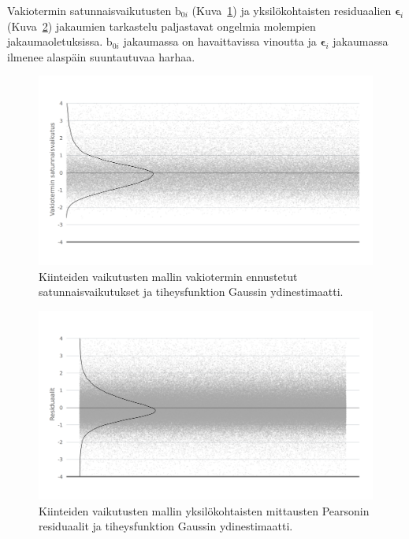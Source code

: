\documentclass[finnish]{docopts}
\begin{document}
Vakiotermin satunnaisvaikutusten $\text{b}_{0i}$ (Kuva~\ref{fig:lme1_ranef}) ja yksilökohtaisten residuaalien $\bm{\epsilon}_i$ (Kuva~\ref{fig:lme1_resid}) jakaumien tarkastelu paljastavat ongelmia molempien jakaumaoletuksissa. $\text{b}_{0i}$ jakaumassa on havaittavissa vinoutta ja $\bm{\epsilon}_i$ jakaumassa ilmenee alaspäin suuntautuvaa harhaa.\\

\begin{figure}[H]
\centering
  \includegraphics[scale=0.8]{kuvaajat/lme_satunnaisvaikutukset.png}
  \caption{Kiinteiden vaikutusten mallin vakiotermin ennustetut satunnaisvaikutukset ja tiheysfunktion Gaussin ydinestimaatti.}
  \label{fig:lme1_ranef}
\end{figure}

\begin{figure}[H]
\centering
  \includegraphics[scale=0.8]{kuvaajat/lme_residuaalit.png}
  \caption{Kiinteiden vaikutusten mallin yksilökohtaisten mittausten Pearsonin residuaalit ja tiheysfunktion Gaussin ydinestimaatti.}
  \label{fig:lme1_resid}
\end{figure}
\end{document}
